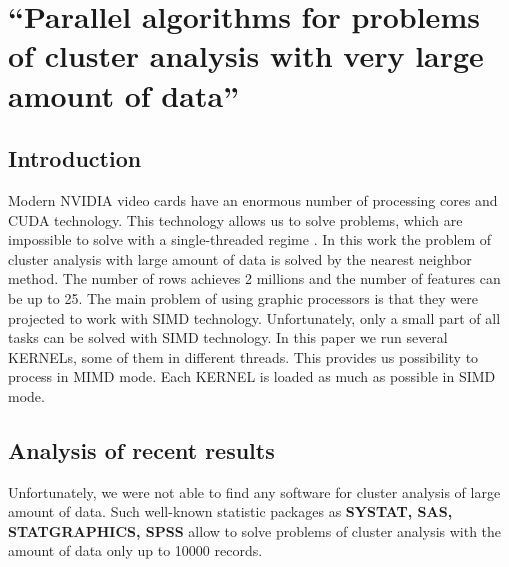 \documentclass{TAACpaper}
\begin{document}

\section{
``Parallel algorithms for problems of cluster analysis with very large amount of data'' 
}



\subsection{Introduction}
Modern NVIDIA video cards have an enormous number of processing cores and CUDA technology. This technology allows us to solve problems, which are impossible to solve with a single-threaded regime \cite{best}. In this work the problem of cluster analysis with large amount of data is solved by the nearest neighbor method. The number of rows achieves 2 millions and the number of features can be up to 25. The main problem of using graphic processors is that they were projected to work with SIMD technology. Unfortunately, only a small part of all tasks can be solved with SIMD technology. In this paper we run several KERNELs, some of them in different threads. This provides us possibility to process in MIMD mode. Each KERNEL is loaded as much as possible in SIMD mode.

\subsection{Analysis of recent results}
Unfortunately, we were not able to find any software for cluster analysis of large amount of data. Such well-known statistic packages as \textbf {SYSTAT, SAS, STATGRAPHICS, SPSS} allow to solve problems of cluster analysis with the amount of data only up to 10000 records.
\end{document}
